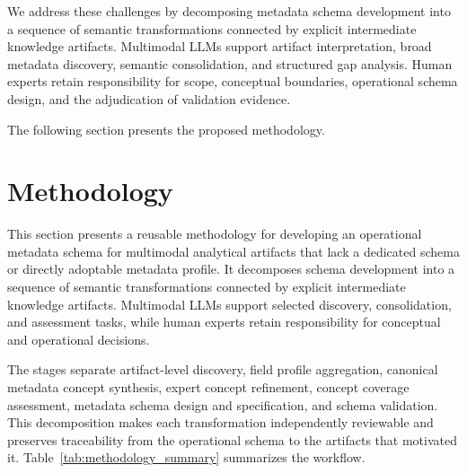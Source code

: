 \documentclass{article}
\begin{document}
We address these challenges by decomposing metadata schema development into a sequence of semantic transformations connected by explicit intermediate knowledge artifacts. Multimodal LLMs support artifact interpretation, broad metadata discovery, semantic consolidation, and structured gap analysis. Human experts retain responsibility for scope, conceptual boundaries, operational schema design, and the adjudication of validation evidence.

The following section presents the proposed methodology.

\section{Methodology}
\label{sec:methodology}

This section presents a reusable methodology for developing an operational metadata schema for multimodal analytical artifacts that lack a dedicated schema or directly adoptable metadata profile. It decomposes schema development into a sequence of semantic transformations connected by explicit intermediate knowledge artifacts. Multimodal LLMs support selected discovery, consolidation, and assessment tasks, while human experts retain responsibility for conceptual and operational decisions.

The stages separate artifact-level discovery, field profile aggregation, canonical metadata concept synthesis, expert concept refinement, concept coverage assessment, metadata schema design and specification, and schema validation. This decomposition makes each transformation independently reviewable and preserves traceability from the operational schema to the artifacts that motivated it. Table~\ref{tab:methodology_summary} summarizes the workflow.
\end{document}

